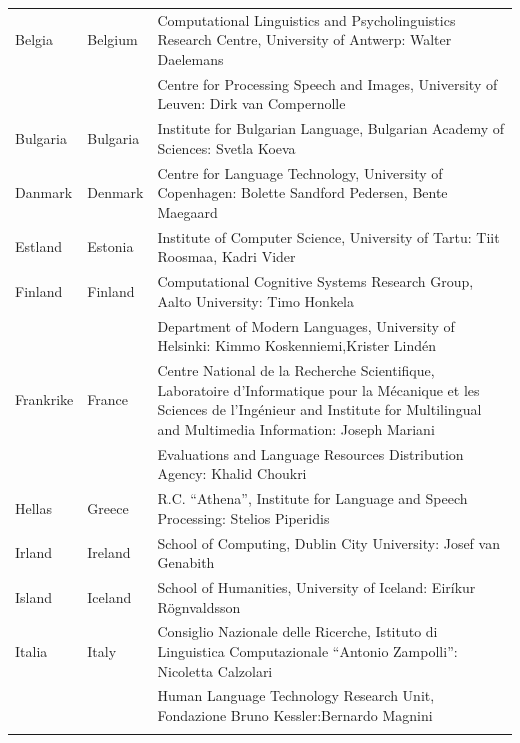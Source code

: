 \small
\begin{longtable}{llp{114mm}}
 Belgia & \textcolor{grey1}{Belgium} & Computational Linguistics and Psycholinguistics Research Centre, University of Antwerp: Walter Daelemans\\ \addlinespace
  & & Centre for Processing Speech and Images, University of Leuven: Dirk van Compernolle \\ \addlinespace
  Bulgaria & \textcolor{grey1}{Bulgaria} & Institute for Bulgarian Language, Bulgarian Academy of Sciences: Svetla Koeva \\ \addlinespace
  Danmark &  \textcolor{grey1}{Denmark} & Centre for Language Technology, University of Copenhagen: \newline Bolette Sandford Pedersen, Bente Maegaard\\ \addlinespace
  Estland & \textcolor{grey1}{Estonia} & Institute of Computer Science, University of Tartu: Tiit Roosmaa, Kadri Vider\\ \addlinespace
  Finland & \textcolor{grey1}{Finland} & Computational Cognitive Systems Research Group, Aalto University: Timo Honkela\\ \addlinespace
  & & Department of Modern Languages, University of Helsinki: Kimmo Koskenniemi,\newline Krister Lindén \\ \addlinespace
  Frankrike & \textcolor{grey1}{France} & Centre National de la Recherche Scientifique, Laboratoire d'Informatique pour la Mécanique et les Sciences de l'Ingénieur and Institute for Multilingual and Multimedia Information: Joseph Mariani \\ \addlinespace
  & & Evaluations and Language Resources Distribution Agency: Khalid Choukri\\ \addlinespace 
  Hellas & \textcolor{grey1}{Greece} & R.C. “Athena”, Institute for Language and Speech Processing: Stelios Piperidis\\ \addlinespace
  Irland & \textcolor{grey1}{Ireland} & School of Computing, Dublin City University: Josef van Genabith\\ \addlinespace
  Island & \textcolor{grey1}{Iceland} & School of Humanities, University of Iceland: Eiríkur Rögnvaldsson\\ \addlinespace
  Italia & \textcolor{grey1}{Italy} & Consiglio Nazionale delle Ricerche, Istituto di Linguistica Computazionale “Antonio Zampolli”: Nicoletta Calzolari\\ \addlinespace
  & & Human Language Technology Research Unit, Fondazione Bruno Kessler:\newline Bernardo Magnini\\ \addlinespace 

\end{longtable}
